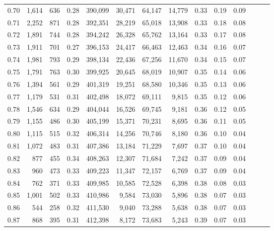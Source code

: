 \begin{tabular}{rrrrrrrrrrrrrr}
0.70 &   1,614 &    636 &  0.28 &  390,099 &   30,471 &  64,147 &  14,779 &  0.33 &  0.19 &      0.09 \\
0.71 &   2,252 &    871 &  0.28 &  392,351 &   28,219 &  65,018 &  13,908 &  0.33 &  0.18 &      0.08 \\
0.72 &   1,891 &    744 &  0.28 &  394,242 &   26,328 &  65,762 &  13,164 &  0.33 &  0.17 &      0.08 \\
0.73 &   1,911 &    701 &  0.27 &  396,153 &   24,417 &  66,463 &  12,463 &  0.34 &  0.16 &      0.07 \\
0.74 &   1,981 &    793 &  0.29 &  398,134 &   22,436 &  67,256 &  11,670 &  0.34 &  0.15 &      0.07 \\
0.75 &   1,791 &    763 &  0.30 &  399,925 &   20,645 &  68,019 &  10,907 &  0.35 &  0.14 &      0.06 \\
0.76 &   1,394 &    561 &  0.29 &  401,319 &   19,251 &  68,580 &  10,346 &  0.35 &  0.13 &      0.06 \\
0.77 &   1,179 &    531 &  0.31 &  402,498 &   18,072 &  69,111 &   9,815 &  0.35 &  0.12 &      0.06 \\
0.78 &   1,546 &    634 &  0.29 &  404,044 &   16,526 &  69,745 &   9,181 &  0.36 &  0.12 &      0.05 \\
0.79 &   1,155 &    486 &  0.30 &  405,199 &   15,371 &  70,231 &   8,695 &  0.36 &  0.11 &      0.05 \\
0.80 &   1,115 &    515 &  0.32 &  406,314 &   14,256 &  70,746 &   8,180 &  0.36 &  0.10 &      0.04 \\
0.81 &   1,072 &    483 &  0.31 &  407,386 &   13,184 &  71,229 &   7,697 &  0.37 &  0.10 &      0.04 \\
0.82 &     877 &    455 &  0.34 &  408,263 &   12,307 &  71,684 &   7,242 &  0.37 &  0.09 &      0.04 \\
0.83 &     960 &    473 &  0.33 &  409,223 &   11,347 &  72,157 &   6,769 &  0.37 &  0.09 &      0.04 \\
0.84 &     762 &    371 &  0.33 &  409,985 &   10,585 &  72,528 &   6,398 &  0.38 &  0.08 &      0.03 \\
0.85 &   1,001 &    502 &  0.33 &  410,986 &    9,584 &  73,030 &   5,896 &  0.38 &  0.07 &      0.03 \\
0.86 &     544 &    258 &  0.32 &  411,530 &    9,040 &  73,288 &   5,638 &  0.38 &  0.07 &      0.03 \\
0.87 &     868 &    395 &  0.31 &  412,398 &    8,172 &  73,683 &   5,243 &  0.39 &  0.07 &      0.03 \\

\end{tabular}
